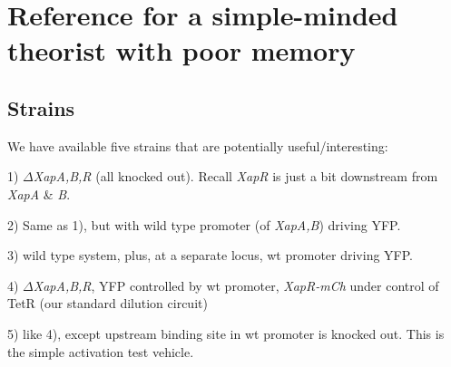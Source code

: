 \documentclass[12pt]{article}%
\begin{document}
\appendix

\section{Reference for a simple-minded theorist with poor memory}

\subsection{Strains}
We have available five strains that are potentially useful/interesting:

1) $\Delta$\textit{XapA,B,R} (all knocked out).
Recall \textit{XapR} is just a bit downstream from \textit{XapA} \& \textit{B}.

2) Same as 1), but with wild type promoter (of \textit{XapA,B}) driving YFP.

3) wild type system, plus, at a separate locus, wt promoter driving YFP.

4) $\Delta$\textit{XapA,B,R}, YFP controlled by wt promoter,
\textit{XapR-mCh} under control of TetR (our standard dilution circuit)

5) like 4), except upstream binding site in wt promoter is knocked out.
This is the simple activation test vehicle.

\appendix



% 

\end{document}

